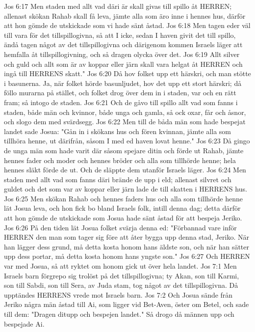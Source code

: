 Jos 6:17  Men staden med allt vad däri är skall givas till spillo åt HERREN; allenast skökan Rahab skall få leva, jämte alla som äro inne i hennes hus, därför att hon gömde de utskickade som vi hade sänt åstad.
Jos 6:18  Men tagen eder väl till vara för det tillspillogivna, så att I icke, sedan I haven givit det till spillo, ändå tagen något av det tillspillogivna och därigenom kommen Israels läger att hemfalla åt tillspillogivning, och så dragen olycka över det.
Jos 6:19  Allt silver och guld och allt som är av koppar eller järn skall vara helgat åt HERREN och ingå till HERRENS skatt."
Jos 6:20  Då hov folket upp ett härskri, och man stötte i basunerna. Ja, när folket hörde basunljudet, hov det upp ett stort härskri; då föllo murarna på stället, och folket drog över dem in i staden, var och en rätt fram; så intogo de staden.
Jos 6:21  Och de gåvo till spillo allt vad som fanns i staden, både män och kvinnor, både unga och gamla, så ock oxar, får och åsnor, och slogo dem med svärdsegg.
Jos 6:22  Men till de båda män som hade bespejat landet sade Josua: "Gån in i skökans hus och fören kvinnan, jämte alla som tillhöra henne, ut därifrån, såsom I med ed haven lovat henne."
Jos 6:23  Då gingo de unga män som hade varit där såsom spejare ditin och förde ut Rahab, jämte hennes fader och moder och hennes bröder och alla som tillhörde henne; hela hennes släkt förde de ut. Och de släppte dem utanför Israels läger.
Jos 6:24  Men staden med allt vad som fanns däri brände de upp i eld; allenast silvret och guldet och det som var av koppar eller järn lade de till skatten i HERRENS hus.
Jos 6:25  Men skökan Rahab och hennes faders hus och alla som tillhörde henne lät Josua leva, och hon fick bo bland Israels folk, intill denna dag; detta därför att hon gömde de utskickade som Josua hade sänt åstad för att bespeja Jeriko.
Jos 6:26  På den tiden lät Josua folket svärja denna ed: "Förbannad vare inför HERREN den man som tager sig före att åter bygga upp denna stad, Jeriko. När han lägger dess grund, må detta kosta honom hans äldste son, och när han sätter upp dess portar, må detta kosta honom hans yngste son."
Jos 6:27  Och HERREN var med Josua, så att ryktet om honom gick ut över hela landet.
Jos 7:1  Men Israels barn förgrepo sig trolöst på det tillspillogivna; ty Akan, son till Karmi, son till Sabdi, son till Sera, av Juda stam, tog något av det tillspillogivna. Då upptändes HERRENS vrede mot Israels barn.
Jos 7:2  Och Josua sände från Jeriko några män åstad till Ai, som ligger vid Bet-Aven, öster om Betel, och sade till dem: "Dragen ditupp och bespejen landet." Så drogo då männen upp och bespejade Ai.
